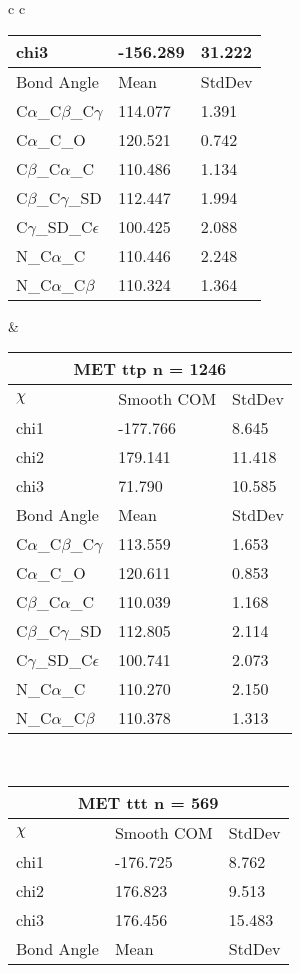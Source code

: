 \begin{longtable}{ c c }
\begin{tabular}{ l l l }
  chi3 & -156.289 & 31.222 \\ \midrule
  Bond Angle   & Mean     & StdDev \\ \midrule
  C$\alpha$\_C$\beta$\_C$\gamma$ & 114.077 & 1.391\\
  C$\alpha$\_C\_O & 120.521 & 0.742\\
  C$\beta$\_C$\alpha$\_C & 110.486 & 1.134\\
  C$\beta$\_C$\gamma$\_SD & 112.447 & 1.994\\
  C$\gamma$\_SD\_C$\epsilon$ & 100.425 & 2.088\\
  N\_C$\alpha$\_C & 110.446 & 2.248\\
  N\_C$\alpha$\_C$\beta$ & 110.324 & 1.364\\
  \bottomrule
  \end{tabular}
  &
  \begin{tabular}{ l l l }
  \toprule
  \multicolumn{3}{c}{MET \textbf{ttp} n = 1246} \\ \toprule
  $\chi$       & Smooth COM & StdDev \\ \midrule
  chi1 & -177.766 & 8.645 \\ 
  chi2 & 179.141 & 11.418 \\ 
  chi3 & 71.790 & 10.585 \\ \midrule
  Bond Angle   & Mean     & StdDev \\ \midrule
  C$\alpha$\_C$\beta$\_C$\gamma$ & 113.559 & 1.653\\
  C$\alpha$\_C\_O & 120.611 & 0.853\\
  C$\beta$\_C$\alpha$\_C & 110.039 & 1.168\\
  C$\beta$\_C$\gamma$\_SD & 112.805 & 2.114\\
  C$\gamma$\_SD\_C$\epsilon$ & 100.741 & 2.073\\
  N\_C$\alpha$\_C & 110.270 & 2.150\\
  N\_C$\alpha$\_C$\beta$ & 110.378 & 1.313\\
  \bottomrule
  \end{tabular}
  \\
  \begin{tabular}{ l l l }
  \toprule
  \multicolumn{3}{c}{MET \textbf{ttt} n = 569} \\ \toprule
  $\chi$       & Smooth COM & StdDev \\ \midrule
  chi1 & -176.725 & 8.762 \\ 
  chi2 & 176.823 & 9.513 \\ 
  chi3 & 176.456 & 15.483 \\ \midrule
  Bond Angle   & Mean     & StdDev \\ \midrule

\end{tabular}
\end{longtable}
